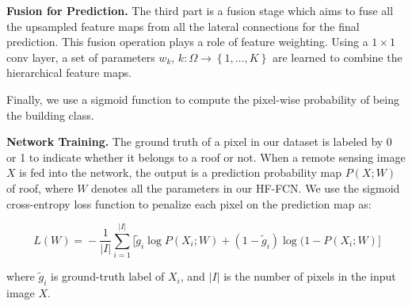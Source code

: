 \noindent\textbf{Fusion for Prediction.} The third part is a fusion stage which aims to fuse all the upsampled feature maps from all the lateral connections for the final prediction.
%
This fusion operation plays a role of feature weighting.
Using a ${1\times1}$ conv layer, a set of parameters ${w_k}$, ${k:\Omega \to\left\{1,\ldots,K\right\}}$ are learned to combine the hierarchical feature maps.


Finally, we use a sigmoid function to compute the pixel-wise probability of being the building class.
%


\noindent\textbf{Network Training.}
The ground truth of a pixel in our dataset is labeled by 0 or 1 to indicate whether it belongs to a roof or not.
When a remote sensing image ${X}$ is fed into the network, the output is a prediction probability map $P(X;W)$ of roof, where $W$ denotes all the parameters in our HF-FCN.
We use the sigmoid cross-entropy loss function to penalize each pixel on the prediction map as:
\begin{small}
\begin{equation}
     \label{loss}
     \ L(W)\! =\! -\frac{1}{\vert I\vert}\sum_{i=1}^{\vert I \vert}\lbrack{\tilde{g}_i \log{P(X_{i};W)}\!+\!(1\!-\!\tilde{g}_i)\log(1\!-\!P(X_{i};W)}\rbrack
\end{equation}
\end{small}
where $\tilde{g}_i$ is ground-truth label of $X_{i}$, and ${\vert I\vert}$ is the number of pixels in the input image ${X}$.
